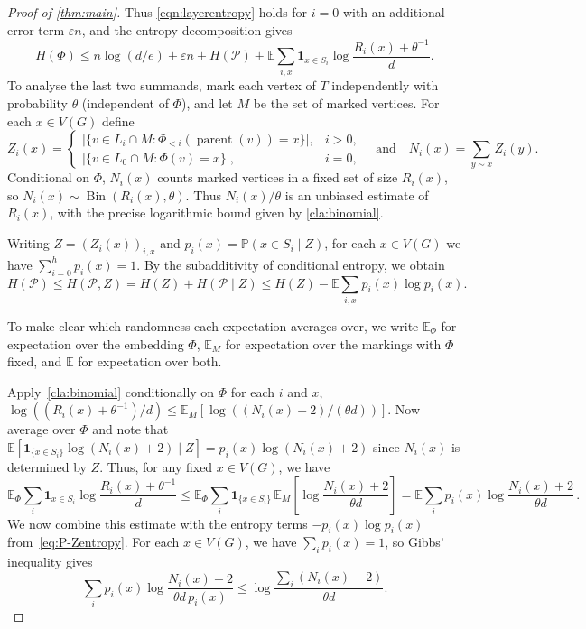 \documentclass[reqno,final,a4paper]{amsart}
\numberwithin{equation}{section}
\theoremstyle{definition}
\theoremstyle{remark}
\DeclareMathOperator{\parent}{parent}
\DeclareMathOperator{\Bin}{Bin}
\newcommand{\eps}{\varepsilon}
\begin{document}
\begin{proof}[Proof of \cref{thm:main}]
Thus \eqref{eqn:layerentropy} holds for $i=0$ with an additional error term
$\varepsilon n$, and the entropy decomposition gives
\begin{equation}\label{eq:startingpoint}
    H(\Phi)\leq n\log\left(d/e\right)+\eps n + H(\mathcal{P})+
    \mathbb E\sum_{i,x}\mathbf{1}_{x\in S_i}\log\frac{R_i(x)+\theta^{-1}}{d}.
\end{equation}
To analyse the last two summands, mark each vertex of $T$ independently with probability $\theta$ (independent of $\Phi$), and let $M$ be the set of marked vertices. For each $x\in V(G)$ define
\[
Z_i(x)=
\begin{cases}
\bigl|\{v\in L_i \cap M:\Phi_{<i}(\parent(v))= x\}\bigr|, & i>0,\\
\bigl|\{v\in L_0 \cap M:\Phi(v)=x\}\bigr|, & i=0,
\end{cases}
\quad\text{and}\quad
N_i(x)=\sum_{y\sim x}Z_i(y).
\]
Conditional on $\Phi$, $N_i(x)$ counts marked vertices in a fixed
set of size $R_i(x)$, so $N_i(x)\sim\Bin(R_i(x),\theta)$.
Thus $N_i(x)/\theta$ is an unbiased estimate of $R_i(x)$, with the
precise logarithmic bound given by \cref{cla:binomial}.

Writing $Z=(Z_i(x))_{i,x}$ and $p_i(x)=\mathbb{P}(x\in S_i\mid Z)$, for each $x\in V(G)$ we have $\sum_{i=0}^hp_i(x)=1$. 
By the subadditivity of conditional entropy, we obtain
\begin{equation}\label{eq:P-Zentropy}
    H(\mathcal{P})\leq H(\mathcal{P},Z)=H(Z)+H(\mathcal{P}\mid Z)\leq H(Z)-\mathbb{E}\sum_{i,x}p_i(x)\log p_i(x).
\end{equation} 

To make clear which randomness each expectation averages over,
we write $\mathbb E_\Phi$ for expectation over the embedding $\Phi$,
$\mathbb E_M$ for expectation over the markings with $\Phi$ fixed,
and $\mathbb E$ for expectation over both.

Apply~\cref{cla:binomial} conditionally on $\Phi$  for each $i$ and $x$, 
$ \log((R_i(x)+\theta^{-1})/d) \leq
\mathbb E_M\left[ \log((N_i(x)+2)/(\theta d))\right]$. 
Now average over $\Phi$ and note that 
$\mathbb E \left[ \mathbf{1}_{\{x\in S_i\}} \log (N_i(x)+2) \mid Z \right] = p_i(x) \log (N_i(x)+2)$ since $N_i(x)$ is determined by $Z$. 
Thus, for any fixed $x\in V(G)$, we have
\begin{equation}\label{eq:apply33}
    \mathbb E_\Phi\sum_{i}\mathbf{1}_{x\in S_i}\log\frac{R_i(x)+\theta^{-1}}{d}\leq \mathbb{E}_{\Phi}\sum_i
\mathbf{1}_{\{x\in S_i\}}\,
\mathbb{E}_{M}\!\left[
\log\frac{N_i(x)+2}{\theta d}
\right] = \mathbb E \sum_i p_i(x) \log\frac{N_i(x)+2}{\theta d}\,.
\end{equation}
We now combine this estimate with the entropy terms $-p_i(x)\log p_i(x)$ from~\eqref{eq:P-Zentropy}. For each $x\in V(G)$, we have $\sum_i p_i(x)=1$, so Gibbs' inequality gives
\begin{equation}\label{eq:Gibbs-application}
\sum_i p_i(x)\log\frac{N_i(x)+2}{\theta d\,p_i(x)} \leq \log\frac{\sum_i(N_i(x)+2)}{\theta d}.
\end{equation}


\end{proof}
\end{document}
